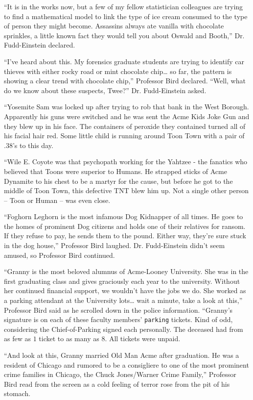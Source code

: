 \documentclass[captions=tableheading]{scrbook}
\begin{document}
\begin{example}
“It is in the works now, but a few of my fellow statistician colleagues are trying to find a mathematical model to link the type of ice cream consumed to the type of person they might become. Assassins always ate vanilla with chocolate sprinkles, a little known fact they would tell you about Oswald and Booth,” Dr. Fudd-Einstein declared.

“I’ve heard about this. My forensics graduate students are trying to identify car thieves with either rocky road or mint chocolate chip… so far, the pattern is showing a clear trend with chocolate chip,” Professor Bird declared. 
“Well, what do we know about these suspects, Twee?” Dr. Fudd-Einstein asked.

“Yosemite Sam was locked up after trying to rob that bank in the West Borough. Apparently his guns were switched and he was sent the Acme Kids Joke Gun and they blew up in his face. The containers of peroxide they contained turned all of his facial hair red. Some little child is running around Toon Town with a pair of .38’s to this day. 

“Wile E. Coyote was that psychopath working for the Yahtzee - the fanatics who believed that Toons were superior to Humans. He strapped sticks of Acme Dynamite to his chest to be a martyr for the cause, but before he got to the middle of Toon Town, this defective TNT blew him up. Not a single other person -- Toon or Human -- was even close.

“Foghorn Leghorn is the most infamous Dog Kidnapper of all times. He goes to the homes of prominent Dog citizens and holds one of their relatives for ransom. If they refuse to pay, he sends them to the pound. Either way, they’re sure stuck in the dog house,” Professor Bird laughed. Dr. Fudd-Einstein didn’t seem amused, so Professor Bird continued. 

“Granny is the most beloved alumnus of Acme-Looney University. She was in the first graduating class and gives graciously each year to the university. Without her continued financial support, we wouldn’t have the jobs we do. She worked as a parking attendant at the University lots\ldots{} wait a minute, take a look at this,” Professor Bird said as he scrolled down in the police information. “Granny’s signature is on each of these faculty members’ \texttt{parking} tickets. Kind of odd, considering the Chief-of-Parking signed each personally. The deceased had from as few as \(  1 \) ticket to as many as \(  8 \). All tickets were unpaid.

“And look at this, Granny married Old Man Acme after graduation. He was a resident of Chicago and rumored to be a consigliere to one of the most prominent crime families in Chicago, the Chuck Jones/Warner Crime Family,” Professor Bird read from the screen as a cold feeling of terror rose from the pit of his stomach. 


\end{example}
\end{document}
